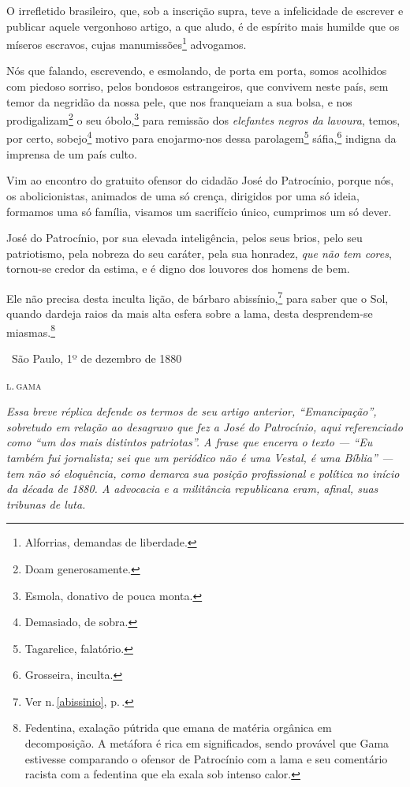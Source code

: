 {O irrefletido brasileiro, que, sob a inscrição supra, teve a
infelicidade de escrever e publicar aquele vergonhoso artigo, a que
aludo, é de espírito mais humilde que os míseros escravos, cujas
manumissões\footnote{Alforrias, demandas de liberdade.} advogamos.

Nós que falando, escrevendo, e esmolando, de porta em porta, somos
acolhidos com piedoso sorriso, pelos bondosos estrangeiros, que convivem
neste país, sem temor da negridão da nossa pele, que nos franqueiam a
sua bolsa, e nos prodigalizam\footnote{Doam generosamente.} o seu
óbolo,\footnote{Esmola, donativo de pouca monta.} para remissão dos
\emph{elefantes negros da lavoura}, temos, por certo, sobejo\footnote{
  Demasiado, de sobra.} motivo para enojarmo-nos dessa
parolagem\footnote{Tagarelice, falatório.} sáfia,\footnote{
  Grosseira, inculta.} indigna da imprensa de um país culto.

Vim ao encontro do gratuito ofensor do cidadão José do Patrocínio,
porque nós, os abolicionistas, animados de uma só crença, dirigidos por
uma só ideia, formamos uma só família, visamos um sacrifício único,
cumprimos um só dever.

José do Patrocínio, por sua elevada inteligência, pelos seus brios, pelo
seu patriotismo, pela nobreza do seu caráter, pela sua honradez,
\emph{que não tem cores}, tornou-se credor da estima, e é digno dos
louvores dos homens de bem.

Ele não precisa desta inculta lição, de bárbaro abissínio,\footnote{Ver n.\,\ref{abissinio}, p.\,\pageref{abissinio}.} para saber que o Sol, quando dardeja
raios da mais alta esfera sobre a lama, desta desprendem-se
miasmas.\footnote{Fedentina, exalação pútrida que emana de matéria
  orgânica em decomposição. A metáfora é rica em significados, sendo
  provável que Gama estivesse comparando o ofensor de Patrocínio com a
  lama e seu comentário racista com a fedentina que ela exala sob
  intenso calor.}

\medskip

\hfill\ São Paulo, 1º de dezembro de 1880

\hfill\textsc{l.\,gama}


\begin{resumo}
\emph{Essa breve réplica defende os termos de seu artigo anterior, ``Emancipação'',
sobretudo em relação ao desagravo que fez a José
do Patrocínio, aqui referenciado como ``um dos mais distintos patriotas''.
A frase que encerra o texto --- ``Eu também fui jornalista; sei que um
periódico não é uma Vestal, é uma Bíblia'' --- tem não só eloquência,
como demarca sua posição profissional e política no início da década de
1880. A advocacia e a militância republicana eram, afinal, suas tribunas
de luta.}
\end{resumo}

}
